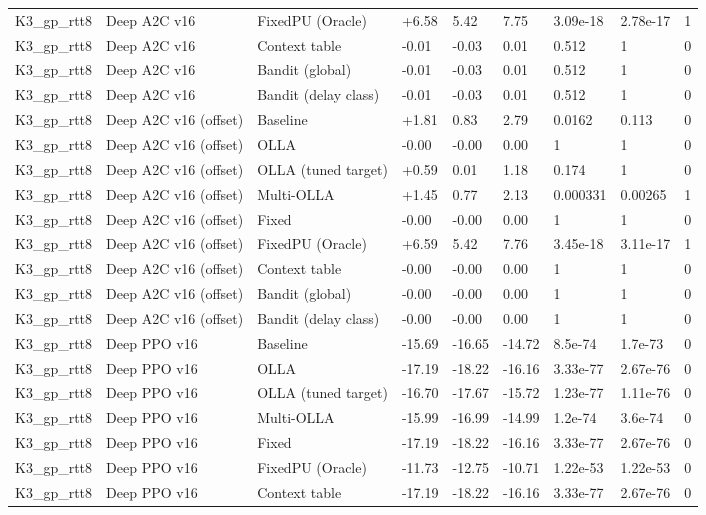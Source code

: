 \documentclass[10pt]{article}
\begin{document}
\begin{landscape}
\begin{longtable}{@{}lllllllll@{}}
K3\_gp\_rtt8 & Deep A2C v16 & FixedPU (Oracle) & +6.58 & 5.42 & 7.75 & 3.09e-18 & 2.78e-17 & 1 \\
K3\_gp\_rtt8 & Deep A2C v16 & Context table & -0.01 & -0.03 & 0.01 & 0.512 & 1 & 0 \\
K3\_gp\_rtt8 & Deep A2C v16 & Bandit (global) & -0.01 & -0.03 & 0.01 & 0.512 & 1 & 0 \\
K3\_gp\_rtt8 & Deep A2C v16 & Bandit (delay class) & -0.01 & -0.03 & 0.01 & 0.512 & 1 & 0 \\
K3\_gp\_rtt8 & Deep A2C v16 (offset) & Baseline & +1.81 & 0.83 & 2.79 & 0.0162 & 0.113 & 0 \\
K3\_gp\_rtt8 & Deep A2C v16 (offset) & OLLA & -0.00 & -0.00 & 0.00 & 1 & 1 & 0 \\
K3\_gp\_rtt8 & Deep A2C v16 (offset) & OLLA (tuned target) & +0.59 & 0.01 & 1.18 & 0.174 & 1 & 0 \\
K3\_gp\_rtt8 & Deep A2C v16 (offset) & Multi-OLLA & +1.45 & 0.77 & 2.13 & 0.000331 & 0.00265 & 1 \\
K3\_gp\_rtt8 & Deep A2C v16 (offset) & Fixed & -0.00 & -0.00 & 0.00 & 1 & 1 & 0 \\
K3\_gp\_rtt8 & Deep A2C v16 (offset) & FixedPU (Oracle) & +6.59 & 5.42 & 7.76 & 3.45e-18 & 3.11e-17 & 1 \\
K3\_gp\_rtt8 & Deep A2C v16 (offset) & Context table & -0.00 & -0.00 & 0.00 & 1 & 1 & 0 \\
K3\_gp\_rtt8 & Deep A2C v16 (offset) & Bandit (global) & -0.00 & -0.00 & 0.00 & 1 & 1 & 0 \\
K3\_gp\_rtt8 & Deep A2C v16 (offset) & Bandit (delay class) & -0.00 & -0.00 & 0.00 & 1 & 1 & 0 \\
K3\_gp\_rtt8 & Deep PPO v16 & Baseline & -15.69 & -16.65 & -14.72 & 8.5e-74 & 1.7e-73 & 0 \\
K3\_gp\_rtt8 & Deep PPO v16 & OLLA & -17.19 & -18.22 & -16.16 & 3.33e-77 & 2.67e-76 & 0 \\
K3\_gp\_rtt8 & Deep PPO v16 & OLLA (tuned target) & -16.70 & -17.67 & -15.72 & 1.23e-77 & 1.11e-76 & 0 \\
K3\_gp\_rtt8 & Deep PPO v16 & Multi-OLLA & -15.99 & -16.99 & -14.99 & 1.2e-74 & 3.6e-74 & 0 \\
K3\_gp\_rtt8 & Deep PPO v16 & Fixed & -17.19 & -18.22 & -16.16 & 3.33e-77 & 2.67e-76 & 0 \\
K3\_gp\_rtt8 & Deep PPO v16 & FixedPU (Oracle) & -11.73 & -12.75 & -10.71 & 1.22e-53 & 1.22e-53 & 0 \\
K3\_gp\_rtt8 & Deep PPO v16 & Context table & -17.19 & -18.22 & -16.16 & 3.33e-77 & 2.67e-76 & 0 \\

\end{longtable}
\end{landscape}
\end{document}
